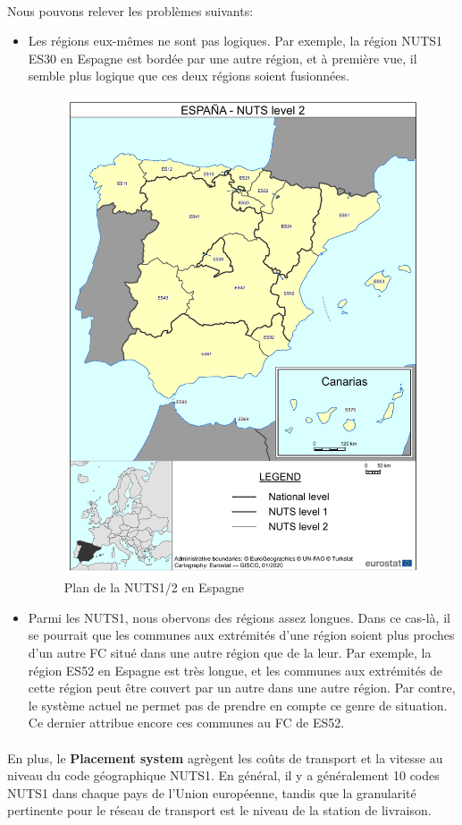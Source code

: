 \paragraph{}
\vspace{-2em}
Nous pouvons relever les problèmes suivants:
\begin{itemize}
    \item Les régions eux-mêmes ne sont pas logiques. Par exemple, la région NUTS1 ES30 en Espagne est bordée par une autre région, et à première vue, il semble plus logique que ces deux régions soient fusionnées.
    \begin{figure}[htbp]
        \centering
        \includegraphics[width=0.6\linewidth]{./Graphismes-UTC/logos/Amazon/NUTS-2-ES.pdf}\hfill
        \caption{Plan de la NUTS1/2 en Espagne \cite{nuts2es}}
    \end{figure}
    \item Parmi les NUTS1, nous obervons des régions assez longues. Dans ce cas-là, il se pourrait que les communes aux extrémités d'une région soient plus proches d'un autre FC situé dans une autre région que de la leur. Par exemple, la région ES52 en Espagne est très longue, et les communes aux extrémités de cette région peut être couvert par un autre dans une autre région. Par contre, le système actuel ne permet pas de prendre en compte ce genre de situation. Ce dernier attribue encore ces communes au FC de ES52.
\end{itemize}
\paragraph{}
\vspace{-2em}
En plus, le \textbf{Placement system} agrègent les coûts de transport et la vitesse au niveau du code géographique NUTS1. En général, il y a généralement 10 codes NUTS1 dans chaque pays de l'Union européenne, tandis que la granularité pertinente pour le réseau de transport est le niveau de la station de livraison.
